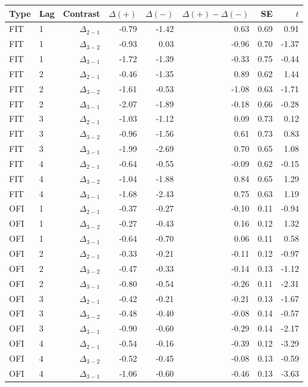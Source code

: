\begin{tabular}{llrrrrrr}
\toprule
Type & Lag & Contrast & $\Delta(+)$ & $\Delta(-)$ & $\Delta(+) - \Delta(-)$ & SE & $t$ \\
\midrule
FIT & 1 & $\Delta_{2-1}$ & -0.79 & -1.42 & 0.63 & 0.69 & 0.91 \\
FIT & 1 & $\Delta_{3-2}$ & -0.93 & 0.03 & -0.96 & 0.70 & -1.37 \\
FIT & 1 & $\Delta_{3-1}$ & -1.72 & -1.39 & -0.33 & 0.75 & -0.44 \\
FIT & 2 & $\Delta_{2-1}$ & -0.46 & -1.35 & 0.89 & 0.62 & 1.44 \\
FIT & 2 & $\Delta_{3-2}$ & -1.61 & -0.53 & -1.08 & 0.63 & -1.71 \\
FIT & 2 & $\Delta_{3-1}$ & -2.07 & -1.89 & -0.18 & 0.66 & -0.28 \\
FIT & 3 & $\Delta_{2-1}$ & -1.03 & -1.12 & 0.09 & 0.73 & 0.12 \\
FIT & 3 & $\Delta_{3-2}$ & -0.96 & -1.56 & 0.61 & 0.73 & 0.83 \\
FIT & 3 & $\Delta_{3-1}$ & -1.99 & -2.69 & 0.70 & 0.65 & 1.08 \\
FIT & 4 & $\Delta_{2-1}$ & -0.64 & -0.55 & -0.09 & 0.62 & -0.15 \\
FIT & 4 & $\Delta_{3-2}$ & -1.04 & -1.88 & 0.84 & 0.65 & 1.29 \\
FIT & 4 & $\Delta_{3-1}$ & -1.68 & -2.43 & 0.75 & 0.63 & 1.19 \\
\addlinespace
OFI & 1 & $\Delta_{2-1}$ & -0.37 & -0.27 & -0.10 & 0.11 & -0.94 \\
OFI & 1 & $\Delta_{3-2}$ & -0.27 & -0.43 & 0.16 & 0.12 & 1.32 \\
OFI & 1 & $\Delta_{3-1}$ & -0.64 & -0.70 & 0.06 & 0.11 & 0.58 \\
OFI & 2 & $\Delta_{2-1}$ & -0.33 & -0.21 & -0.11 & 0.12 & -0.97 \\
OFI & 2 & $\Delta_{3-2}$ & -0.47 & -0.33 & -0.14 & 0.13 & -1.12 \\
OFI & 2 & $\Delta_{3-1}$ & -0.80 & -0.54 & -0.26 & 0.11 & -2.31 \\
OFI & 3 & $\Delta_{2-1}$ & -0.42 & -0.21 & -0.21 & 0.13 & -1.67 \\
OFI & 3 & $\Delta_{3-2}$ & -0.48 & -0.40 & -0.08 & 0.14 & -0.57 \\
OFI & 3 & $\Delta_{3-1}$ & -0.90 & -0.60 & -0.29 & 0.14 & -2.17 \\
OFI & 4 & $\Delta_{2-1}$ & -0.54 & -0.16 & -0.39 & 0.12 & -3.29 \\
OFI & 4 & $\Delta_{3-2}$ & -0.52 & -0.45 & -0.08 & 0.13 & -0.59 \\
OFI & 4 & $\Delta_{3-1}$ & -1.06 & -0.60 & -0.46 & 0.13 & -3.63 \\
\bottomrule
\end{tabular}
